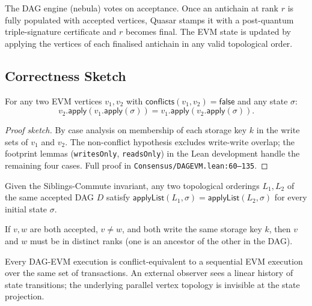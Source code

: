 The DAG engine (nebula) votes on acceptance. Once an antichain at rank $r$
is fully populated with accepted vertices, Quasar stamps it with a
post-quantum triple-signature certificate and $r$ becomes final. The EVM
state is updated by applying the vertices of each finalised antichain in
any valid topological order.

\subsection{Correctness Sketch}

\begin{theorem}
\label{thm:commute}
For any two EVM vertices $v_1, v_2$ with $\mathsf{conflicts}(v_1, v_2)
= \mathsf{false}$ and any state $\sigma$:
\[
v_2.\mathsf{apply}(v_1.\mathsf{apply}(\sigma)) = v_1.\mathsf{apply}(v_2.\mathsf{apply}(\sigma)).
\]
\end{theorem}

\begin{proof}[Proof sketch]
By case analysis on membership of each storage key $k$ in the write sets
of $v_1$ and $v_2$. The non-conflict hypothesis excludes write-write
overlap; the footprint lemmas (\texttt{writesOnly}, \texttt{readsOnly}) in
the Lean development handle the remaining four cases. Full proof in
\texttt{Consensus/DAGEVM.lean:60--135}.
\end{proof}

\begin{theorem}
\label{thm:topo}
Given the Siblings-Commute invariant, any two topological orderings $L_1,
L_2$ of the same accepted DAG $D$ satisfy
$\mathsf{applyList}(L_1, \sigma) = \mathsf{applyList}(L_2, \sigma)$
for every initial state $\sigma$.
\end{theorem}

\begin{theorem}
If $v, w$ are both accepted, $v \neq w$, and both write the same storage
key $k$, then $v$ and $w$ must be in distinct ranks (one is an ancestor of
the other in the DAG).
\end{theorem}

\begin{corollary}[Serialisability]
Every DAG-EVM execution is conflict-equivalent to a sequential EVM
execution over the same set of transactions. An external observer sees a
linear history of state transitions; the underlying parallel vertex
topology is invisible at the state projection.
\end{corollary}

